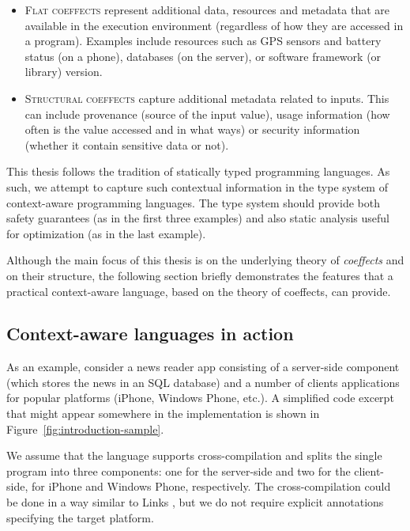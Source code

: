 \begin{itemize}
\item \textsc{Flat coeffects} represent additional data, resources and metadata that are
   available in the execution environment (regardless of how they are accessed in a program).
   Examples include resources such as GPS sensors and battery status (on a phone), databases
   (on the server), or software framework (or library) version.

\item \textsc{Structural coeffects} capture additional metadata related to inputs. This can include
   provenance (source of the input value), usage information (how often is the value
   accessed and in what ways) or security information (whether it contain sensitive data or not).
\end{itemize}
%
This thesis follows the tradition of statically typed programming languages. As such, we
attempt to capture such contextual information in the type system of context-aware programming
languages. The type system should provide both safety guarantees (as in the first three examples)
and also static analysis useful for optimization (as in the last example).

Although the main focus of this thesis is on the underlying theory of \emph{coeffects} and on
their structure, the following section briefly demonstrates the features that a practical
context-aware language, based on the theory of coeffects, can provide.


\subsection{Context-aware languages in action}
\label{sec:intro-context-example}

As an example, consider a news reader app consisting of a server-side component (which stores the
news in an SQL database) and a number of clients applications for popular platforms (iPhone, Windows
Phone, etc.). A simplified code excerpt that might appear somewhere in the implementation is shown in
Figure~\ref{fig:introduction-sample}.

We assume that the language supports cross-compilation and splits the single program into three
components: one for the server-side and two for the client-side, for iPhone and Windows Phone,
respectively. The cross-compilation could be done in a way similar to Links \cite{app-distributed-links},
but we do not require explicit annotations specifying the target platform.

